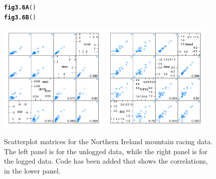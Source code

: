 \documentclass[12pt, a4paper,  BCOR=8.25mm, DIV=15]{scrartcl}\usepackage[]{graphicx}\usepackage[]{color}
\makeatletter
\newcommand{\hlstd}[1]{\textcolor[rgb]{0.345,0.345,0.345}{#1}}%
\newcommand{\hlkwd}[1]{\textcolor[rgb]{0.737,0.353,0.396}{\textbf{#1}}}%
\newenvironment{kframe}{%
 \def\at@end@of@kframe{}%
 \ifinner\ifhmode%
  \def\at@end@of@kframe{\end{minipage}}%
  \begin{minipage}{\columnwidth}%
 \fi\fi%
 \def\FrameCommand##1{\hskip\@totalleftmargin \hskip-\fboxsep
 \colorbox{shadecolor}{##1}\hskip-\fboxsep
     \hskip-\linewidth \hskip-\@totalleftmargin \hskip\columnwidth}%
 \MakeFramed {\advance\hsize-\width
   \@totalleftmargin\z@ \linewidth\hsize
   \@setminipage}}%
 {\par\unskip\endMakeFramed%
 \at@end@of@kframe}
\newenvironment{knitrout}{}{} %
\makeatother
\begin{document}
\begin{figure}
\vspace*{-6pt}
\begin{knitrout}
\color{fgcolor}\begin{kframe}
\begin{alltt}
\hlkwd{fig3.6A}\hlstd{()}
\hlkwd{fig3.6B}\hlstd{()}
\end{alltt}
\end{kframe}

{\centering \includegraphics[width=0.47\textwidth]{figure/exs-fig3_6e-1} 
\includegraphics[width=0.47\textwidth]{figure/exs-fig3_6e-2} 

}



\end{knitrout}
\caption{Scatterplot matrices for the Northern Ireland mountain racing
  data. The left panel is for the unlogged data, while the right panel is
for the logged data.  Code has been added that shows the correlations,
in the lower panel.\label{fig:nimra}}
\end{figure}
\end{document}
